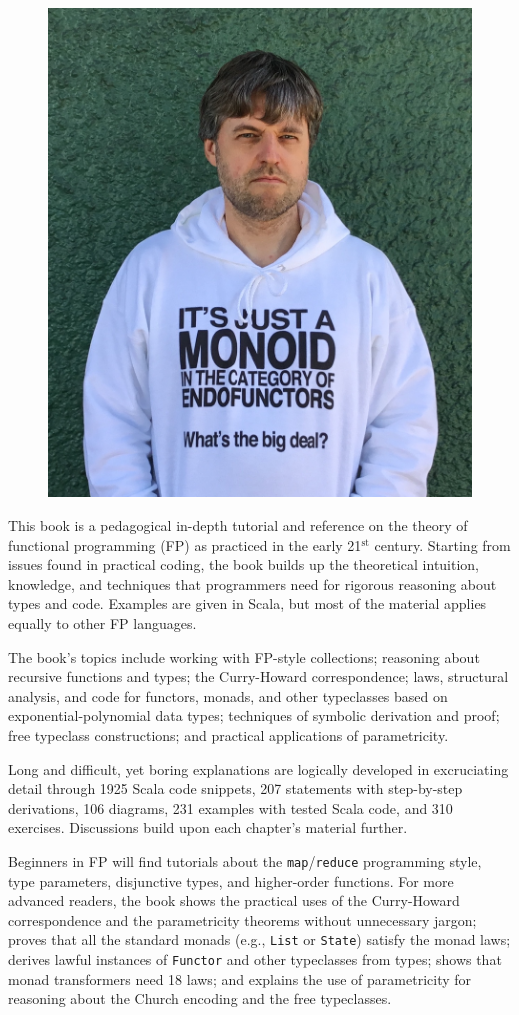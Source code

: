 \onecolumn
\thispagestyle{empty}
 
\begin{figure}
\includegraphics[width=0.4\columnwidth]{monads_evil_face}
\vspace{-2.0\baselineskip}
\end{figure}

\smaller
This book is a pedagogical in-depth tutorial and reference
on the theory of functional programming (FP) as practiced in the early
21$^{\text{st}}$ century. Starting from issues found in practical
coding, the book builds up the theoretical intuition, knowledge, and
techniques that programmers need for rigorous reasoning about types
and code. Examples are given in Scala, but most of the material applies equally
to other FP languages.

The book\textsf{'}s topics include working with FP-style collections; reasoning about recursive
functions and types; the Curry-Howard correspondence; laws, structural
analysis, and code for functors, monads, and other typeclasses based on exponential-polynomial data types; 
techniques of symbolic derivation and proof;
free typeclass constructions; and
practical applications of parametricity.

Long and difficult, yet boring explanations are logically
developed in excruciating detail through 1925
Scala code snippets, 207 statements with step-by-step
derivations, 106 diagrams, 231 examples
with tested Scala code, and 310 exercises. Discussions
build upon each chapter\textsf{'}s material further.

Beginners in FP will find tutorials about the \texttt{map}/\texttt{reduce}
programming style, type parameters, disjunctive types, and higher-order
functions. For more advanced readers, the book shows  the practical
uses of the Curry-Howard correspondence and the parametricity theorems
without unnecessary jargon; proves that all the standard monads (e.g.,
\texttt{List} or \texttt{State})
satisfy the monad laws; derives lawful instances of \texttt{Functor}
and other typeclasses from types; shows that monad transformers need
18 laws;
and explains the use of parametricity for reasoning about the Church encoding and the free typeclasses.


